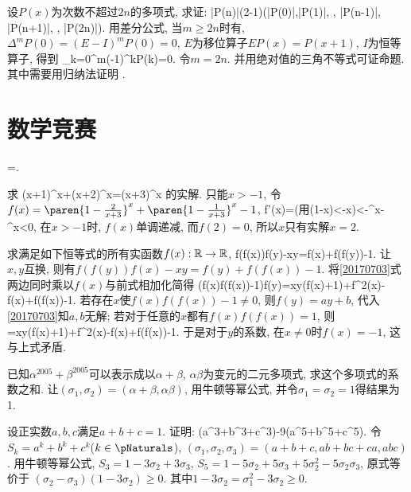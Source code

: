 设$P(x)$为次数不超过$2n$的多项式, 求证:
\bee
|P(n)|\le(2-1)\max(|P(0)|,|P(1)|, \cdots, |P(n-1)|, |P(n+1)|, \cdots, |P(2n)|).
\eee
\eq
\ba
用差分公式, 当$m\ge2n$时有, $\Delta^mP(0)=(E-I)^mP(0)=0$, $E$为移位算子$EP(x)=P(x+1)$, $I$为恒等算子, 得到
\bee
\sum_{k=0}^{m}(-1)^kP(k)=0.
\eee
令$m=2n$. 并用绝对值的三角不等式可证命题. 其中需要用归纳法证明
\bee
{}\ge{}.
\eee
\ea


\section{数学竞赛}
\bee
{}=.
\eee
\eq

\bq{}{}
求
\bee
(x+1)^x+(x+2)^x=(x+3)^x
\eee
的实解.
\eq
\ba
只能$x>-1$, 令$f(x)=\paren{1-\frac2{x+3}}^x+\paren{1-\frac1{x+3}}^x-1$,
\bee
f'(x)=\cdots(\textrm{用}\ln(1-x)<-x)<-^x-^x<0,
\eee
在$x>-1$时, $f(x)$单调递减, 而$f(2)=0$, 所以$x$只有实解$x=2$.
\ea

\bq{}{}
求满足如下恒等式的所有实函数$f(x):\Bbb R\to\Bbb R$,
\be\label{20170703}
f(f(x))f(y)-xy=f(x)+f(f(y))-1.
\ee
\eq
\ba
让$x,y$互换, 则有$f(f(y))f(x)-xy=f(y)+f(f(x))-1$. 将\ref{20170703}式两边同时乘以$f(x)$与前式相加化简得
\bee
(f(x)f(f(x))-1)f(y)=xy(f(x)+1)+f^2(x)-f(x)+f(f(x))-1.
\eee
若存在$x$使$f(x)f(f(x))-1\ne0$, 则$f(y)=ay+b$, 代入\ref{20170703}知$a,b$无解;
若对于任意的$x$都有$f(x)f(f(x))=1$, 则
=xy(f(x)+1)+f^2(x)-f(x)+f(f(x))-1.
\eee
于是对于$y$的系数, 在$x\ne0$时$f(x)=-1$, 这与上式矛盾.
\ea


已知$\alpha^{2005}+\beta^{2005}$可以表示成以$\alpha+\beta$, $\alpha\beta$为变元的二元多项式, 求这个多项式的系数之和.
\eq
\ba
让$(\sigma_1, \sigma_2)=(\alpha+\beta, \alpha\beta)$, 用牛顿等幂公式, 并令$\sigma_1=\sigma_2=1$得结果为1.
\ea

设正实数$a,b,c$满足$a+b+c=1$. 证明:
(a^3+b^3+c^3)-9(a^5+b^5+c^5).
\eee
\eq
\ba
令$S_k=a^k+b^k+c^k$($k\in\pNaturals$), $(\sigma_1,\sigma_2,\sigma_3)=(a+b+c,ab+bc+ca,abc)$. 用牛顿等幂公式,
$S_3=1-3\sigma_2+3\sigma_3$, $S_5=1-5\sigma_2+5\sigma_3+5\sigma_2^2-5\sigma_2\sigma_3$, 原式等价于
$(\sigma_2-\sigma_3)(1-3\sigma_2)\ge0$. 其中$1-3\sigma_2=\sigma_1^2-3\sigma_2\ge0$.
\ea

